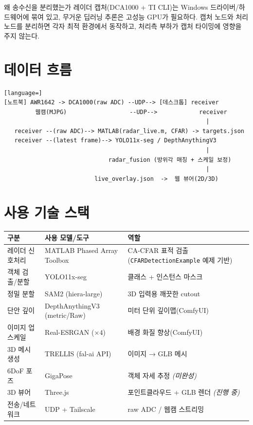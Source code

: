 \begin{designbox}{왜 송수신을 분리했는가}
레이더 캡처(DCA1000 + TI CLI)는 Windows 드라이버/하드웨어에 묶여 있고, 무거운
딥러닝 추론은 고성능 GPU가 필요하다. 캡처 노드와 처리 노드를 분리하면 각자
최적 환경에서 동작하고, 처리측 부하가 캡처 타이밍에 영향을 주지 않는다.
\end{designbox}

\section{데이터 흐름}
\begin{lstlisting}[language=]
[노트북] AWR1642 -> DCA1000(raw ADC) --UDP--> [데스크톱] receiver
         웹캠(MJPG)                  --UDP-->            receiver
                                                          |
   receiver --(raw ADC)--> MATLAB(radar_live.m, CFAR) -> targets.json
   receiver --(latest frame)--> YOLO11x-seg / DepthAnythingV3
                                                          |
                              radar_fusion (방위각 매칭 + 스케일 보정)
                                                          |
                          live_overlay.json  ->  웹 뷰어(2D/3D)
\end{lstlisting}

\section{사용 기술 스택}
\begin{center}
\begin{tabular}{@{}llp{6.2cm}@{}}
\toprule
구분 & 사용 모델/도구 & 역할 \\
\midrule
레이더 신호처리 & MATLAB Phased Array Toolbox & CA-CFAR 표적 검출
  (\texttt{CFARDetectionExample} 예제 기반) \\
객체 검출/분할 & YOLO11x-seg & 클래스 + 인스턴스 마스크 \\
정밀 분할 & SAM2 (hiera-large) & 3D 입력용 깨끗한 cutout \\
단안 깊이 & DepthAnythingV3 (metric/Raw) & 미터 단위 깊이맵(ComfyUI) \\
이미지 업스케일 & Real-ESRGAN ($\times4$) & 배경 화질 향상(ComfyUI) \\
3D 메시 생성 & TRELLIS (fal-ai API) & 이미지 → GLB 메시 \\
6DoF 포즈 & GigaPose & 객체 자세 추정 \emph{(미완성)} \\
3D 뷰어 & Three.js & 포인트클라우드 + GLB 렌더 \emph{(진행 중)} \\
전송/네트워크 & UDP + Tailscale & raw ADC / 웹캠 스트리밍 \\
\bottomrule
\end{tabular}
\end{center}

